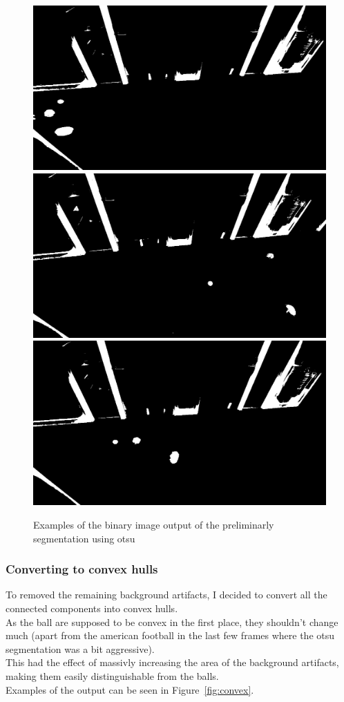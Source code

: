 \documentclass[conference]{IEEEtran}
\begin{document}
        \begin{figure}[htbp]
            \centering
            \includegraphics[width=0.49\columnwidth]{figures/otsu_mask.png}
            \includegraphics[width=0.49\columnwidth]{figures/otsu_mask2.png}
            \includegraphics[width=0.49\columnwidth]{figures/otsu_mask3.png}
            \caption{Examples of the binary image output of the preliminarly segmentation using otsu~\label{fig:otsu}}
        \end{figure}

        \subsubsection{Converting to convex hulls}

        To removed the remaining background artifacts, I decided to convert all the connected components into convex hulls. \\
        As the ball are supposed to be convex in the first place, they shouldn't change much (apart from the american football in the last few 
        frames where the otsu segmentation was a bit aggressive). \\
        This had the effect of massivly increasing the area of the background artifacts, making them 
        easily distinguishable from the balls. \\
        Examples of the output can be seen in Figure~\ref{fig:convex}.
\end{document}
